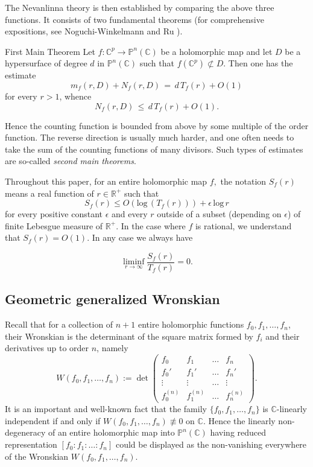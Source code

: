 \documentclass[english, 12pt]{amsart}
\def\log{\mathrm{log}\,}
\theoremstyle{plain}
\theoremstyle{remark}
\numberwithin{equation}{section}
\theoremstyle{plain}
\newcommand{\thistheoremname}{}
\newtheorem*{genericthm*}{\thistheoremname}
\newenvironment{namedthm*}[1]{\renewcommand{\thistheoremname}{#1}%
	\begin{genericthm*}}
	{\end{genericthm*}}
\theoremstyle{named}
\begin{document}
	The Nevanlinna theory is then established by comparing the above three functions. It consists of two fundamental theorems (for  comprehensive expositions, see Noguchi-Winkelmann \cite{Noguchi-Winkelmann2014} and Ru \cite{Ru2021}).
	
	\begin{namedthm*}{First Main Theorem}\label{fmt} Let $f\colon\mathbb{C}^p\rightarrow \mathbb{P}^n(\mathbb{C})$ be a holomorphic map and let $D$ be a hypersurface of degree $d$ in $\mathbb{P}^n(\mathbb{C})$ such that $f(\mathbb{C}^p)\not\subset D$. Then one has the estimate
		\[
		m_f(r,D)
		+
		N_f(r,D)
		\,
		=
		\,
		d\,T_f(r)
		+
		O(1)
		\]
		for every $r>1$,
		whence
		\begin{equation}
		\label{-fmt-inequality}
		N_f(r,D)
		\,
		\leq
		\,
		d\,T_f(r)+O(1).
		\end{equation}
	\end{namedthm*}
	
	Hence the counting function is bounded from above by some multiple of the order function. The reverse direction is usually much harder, and one often needs to take the sum of the counting functions of many divisors. Such types of estimates are so-called {\sl second main theorems}.
	
	
	Throughout this paper, for an entire holomorphic map $f,$ the notation $S_f(r)$ means a real function of $r \in \mathbb{R}^+$ such that 
	\[
	S_f(r) \leq
	O(\log(T_f(r)))+ \epsilon\, \log r
	\]
	for every positive constant $\epsilon$ and every $r$ outside of a subset (depending on $\epsilon$) of finite Lebesgue measure of $\mathbb{R}^+$. In the case where $f$ is rational, we understand that $S_f(r)=O(1)$. In any case we always have
	
	\[
	\liminf_{r\rightarrow\infty}\dfrac{S_f(r)}{T_f(r)}
	=
	0.
	\]
	
	
	\subsection{Geometric generalized Wronskian}
Recall that for a collection of $n+1$ entire holomorphic functions $f_0,f_1,\dots,f_n$, their Wronskian is the determinant of the square matrix formed by $f_i$ and their derivatives up to order $n$, namely
$$
W(f_0,f_1,\dots,f_n)
:=
\det
\begin{pmatrix}
f_0&f_1&\dots&f_n\\
f_0'&f_1'&\dots&f_n'\\
\vdots&\vdots&\dots&\vdots\\
f_0^{(n)}&f_1^{(n)}&\dots&f_n^{(n)}
\end{pmatrix}.
$$
It is an important and well-known fact that the family $\{f_0,f_1,\dots,f_n\}$ is $\mathbb{C}$-linearly independent if and only if $W(f_0,f_1,\dots,f_n)\not\equiv 0$ on $\mathbb{C}$. Hence the linearly non-degeneracy of an entire holomorphic map into $\mathbb{P}^n(\mathbb{C})$ having reduced representation $[f_0:f_1:\dots :f_n]$ could be displayed as the non-vanishing everywhere of the Wronskian $W(f_0,f_1,\dots,f_n)$.
\end{document}
